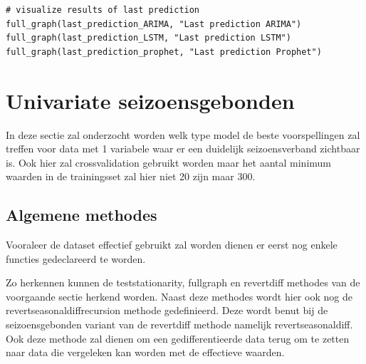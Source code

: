 \begin{verbatim}
# visualize results of last prediction
full_graph(last_prediction_ARIMA, "Last prediction ARIMA")
full_graph(last_prediction_LSTM, "Last prediction LSTM")
full_graph(last_prediction_prophet, "Last prediction Prophet")
\end{verbatim}

\clearpage

\section{Univariate seizoensgebonden}

In deze sectie zal onderzocht worden welk type model de beste voorspellingen zal treffen voor data met 1 variabele waar er een duidelijk seizoensverband zichtbaar is. Ook hier zal crossvalidation gebruikt worden maar het aantal minimum waarden in de trainingsset zal hier niet 20 zijn maar 300.

\subsection{Algemene methodes}

Vooraleer de dataset effectief gebruikt zal worden dienen er eerst nog enkele functies gedeclareerd te worden.

Zo herkennen kunnen de test\textunderscore stationarity, full\textunderscore graph en  revert\textunderscore diff methodes van de voorgaande sectie herkend worden. Naast deze methodes wordt hier ook nog de revert\textunderscore seasonal\textunderscore diff\textunderscore recursion methode gedefinieerd. Deze wordt benut bij de seizoensgebonden variant van de revert\textunderscore diff methode namelijk revert\textunderscore seasonal\textunderscore diff. Ook deze methode zal dienen om een gedifferentieerde data terug om te zetten naar data die vergeleken kan worden met de effectieve waarden.


